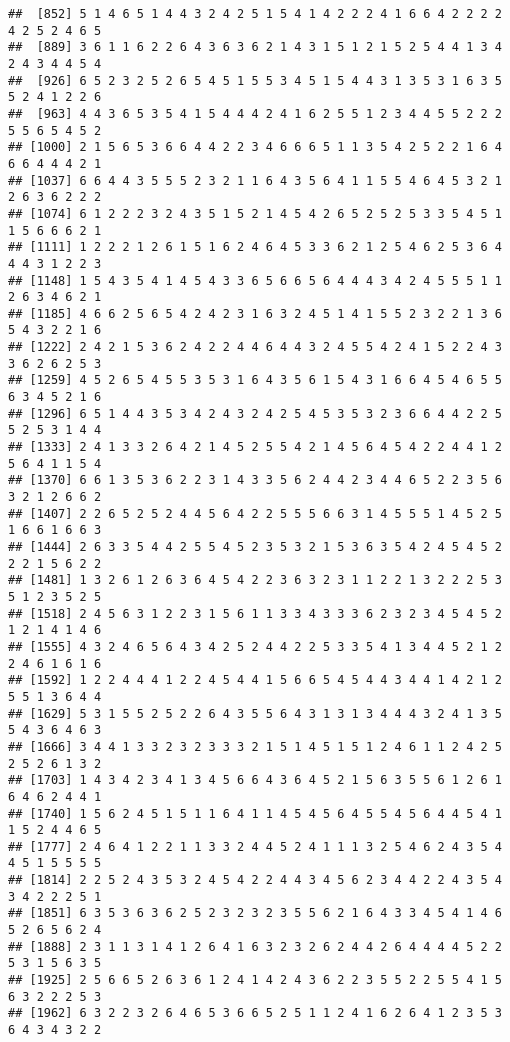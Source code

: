 \documentclass[
]{article}
\begin{document}
\begin{verbatim}
##  [852] 5 1 4 6 5 1 4 4 3 2 4 2 5 1 5 4 1 4 2 2 2 4 1 6 6 4 2 2 2 2 4 2 5 2 4 6 5
##  [889] 3 6 1 1 6 2 2 6 4 3 6 3 6 2 1 4 3 1 5 1 2 1 5 2 5 4 4 1 3 4 2 4 3 4 4 5 4
##  [926] 6 5 2 3 2 5 2 6 5 4 5 1 5 5 3 4 5 1 5 4 4 3 1 3 5 3 1 6 3 5 5 2 4 1 2 2 6
##  [963] 4 4 3 6 5 3 5 4 1 5 4 4 4 2 4 1 6 2 5 5 1 2 3 4 4 5 5 2 2 2 5 5 6 5 4 5 2
## [1000] 2 1 5 6 5 3 6 6 4 4 2 2 3 4 6 6 6 5 1 1 3 5 4 2 5 2 2 1 6 4 6 6 4 4 4 2 1
## [1037] 6 6 4 4 3 5 5 5 2 3 2 1 1 6 4 3 5 6 4 1 1 5 5 4 6 4 5 3 2 1 2 6 3 6 2 2 2
## [1074] 6 1 2 2 2 3 2 4 3 5 1 5 2 1 4 5 4 2 6 5 2 5 2 5 3 3 5 4 5 1 1 5 6 6 6 2 1
## [1111] 1 2 2 2 1 2 6 1 5 1 6 2 4 6 4 5 3 3 6 2 1 2 5 4 6 2 5 3 6 4 4 4 3 1 2 2 3
## [1148] 1 5 4 3 5 4 1 4 5 4 3 3 6 5 6 6 5 6 4 4 4 3 4 2 4 5 5 5 1 1 2 6 3 4 6 2 1
## [1185] 4 6 6 2 5 6 5 4 2 4 2 3 1 6 3 2 4 5 1 4 1 5 5 2 3 2 2 1 3 6 5 4 3 2 2 1 6
## [1222] 2 4 2 1 5 3 6 2 4 2 2 4 4 6 4 4 3 2 4 5 5 4 2 4 1 5 2 2 4 3 3 6 2 6 2 5 3
## [1259] 4 5 2 6 5 4 5 5 3 5 3 1 6 4 3 5 6 1 5 4 3 1 6 6 4 5 4 6 5 5 6 3 4 5 2 1 6
## [1296] 6 5 1 4 4 3 5 3 4 2 4 3 2 4 2 5 4 5 3 5 3 2 3 6 6 4 4 2 2 5 5 2 5 3 1 4 4
## [1333] 2 4 1 3 3 2 6 4 2 1 4 5 2 5 5 4 2 1 4 5 6 4 5 4 2 2 4 4 1 2 5 6 4 1 1 5 4
## [1370] 6 6 1 3 5 3 6 2 2 3 1 4 3 3 5 6 2 4 4 2 3 4 4 6 5 2 2 3 5 6 3 2 1 2 6 6 2
## [1407] 2 2 6 5 2 5 2 4 4 5 6 4 2 2 5 5 5 6 6 3 1 4 5 5 5 1 4 5 2 5 1 6 6 1 6 6 3
## [1444] 2 6 3 3 5 4 4 2 5 5 4 5 2 3 5 3 2 1 5 3 6 3 5 4 2 4 5 4 5 2 2 2 1 5 6 2 2
## [1481] 1 3 2 6 1 2 6 3 6 4 5 4 2 2 3 6 3 2 3 1 1 2 2 1 3 2 2 2 5 3 5 1 2 3 5 2 5
## [1518] 2 4 5 6 3 1 2 2 3 1 5 6 1 1 3 3 4 3 3 3 6 2 3 2 3 4 5 4 5 2 1 2 1 4 1 4 6
## [1555] 4 3 2 4 6 5 6 4 3 4 2 5 2 4 4 2 2 5 3 3 5 4 1 3 4 4 5 2 1 2 2 4 6 1 6 1 6
## [1592] 1 2 2 4 4 4 1 2 2 4 5 4 4 1 5 6 6 5 4 5 4 4 3 4 4 1 4 2 1 2 5 5 1 3 6 4 4
## [1629] 5 3 1 5 5 2 5 2 2 6 4 3 5 5 6 4 3 1 3 1 3 4 4 4 3 2 4 1 3 5 5 4 3 6 4 6 3
## [1666] 3 4 4 1 3 3 2 3 2 3 3 3 2 1 5 1 4 5 1 5 1 2 4 6 1 1 2 4 2 5 2 5 2 6 1 3 2
## [1703] 1 4 3 4 2 3 4 1 3 4 5 6 6 4 3 6 4 5 2 1 5 6 3 5 5 6 1 2 6 1 6 4 6 2 4 4 1
## [1740] 1 5 6 2 4 5 1 5 1 1 6 4 1 1 4 5 4 5 6 4 5 5 4 5 6 4 4 5 4 1 1 5 2 4 4 6 5
## [1777] 2 4 6 4 1 2 2 1 1 3 3 2 4 4 5 2 4 1 1 1 3 2 5 4 6 2 4 3 5 4 4 5 1 5 5 5 5
## [1814] 2 2 5 2 4 3 5 3 2 4 5 4 2 2 4 4 3 4 5 6 2 3 4 4 2 2 4 3 5 4 3 4 2 2 2 5 1
## [1851] 6 3 5 3 6 3 6 2 5 2 3 2 3 2 3 5 5 6 2 1 6 4 3 3 4 5 4 1 4 6 5 2 6 5 6 2 4
## [1888] 2 3 1 1 3 1 4 1 2 6 4 1 6 3 2 3 2 6 2 4 4 2 6 4 4 4 4 5 2 2 5 3 1 5 6 3 5
## [1925] 2 5 6 6 5 2 6 3 6 1 2 4 1 4 2 4 3 6 2 2 3 5 5 2 2 5 5 4 1 5 6 3 2 2 2 5 3
## [1962] 6 3 2 2 3 2 6 4 6 5 3 6 6 5 2 5 1 1 2 4 1 6 2 6 4 1 2 3 5 3 6 4 3 4 3 2 2

\end{verbatim}
\end{document}
